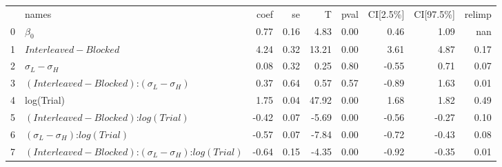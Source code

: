 \begin{tabular}{llrrrrrrr}
 & names & coef & se & T & pval & CI[2.5\%] & CI[97.5\%] & relimp \\
0 & $\beta_0$ & 0.77 & 0.16 & 4.83 & 0.00 & 0.46 & 1.09 & nan \\
1 & $Interleaved - Blocked$ & 4.24 & 0.32 & 13.21 & 0.00 & 3.61 & 4.87 & 0.17 \\
2 & $\sigma_L - \sigma_H$ & 0.08 & 0.32 & 0.25 & 0.80 & -0.55 & 0.71 & 0.07 \\
3 & $(Interleaved - Blocked)$:$(\sigma_L - \sigma_H)$ & 0.37 & 0.64 & 0.57 & 0.57 & -0.89 & 1.63 & 0.01 \\
4 & log(Trial) & 1.75 & 0.04 & 47.92 & 0.00 & 1.68 & 1.82 & 0.49 \\
5 & $(Interleaved - Blocked)$:$log(Trial)$ & -0.42 & 0.07 & -5.69 & 0.00 & -0.56 & -0.27 & 0.10 \\
6 & $(\sigma_L - \sigma_H)$:$log(Trial)$ & -0.57 & 0.07 & -7.84 & 0.00 & -0.72 & -0.43 & 0.08 \\
7 & $(Interleaved - Blocked)$:$(\sigma_L - \sigma_H)$:$log(Trial)$ & -0.64 & 0.15 & -4.35 & 0.00 & -0.92 & -0.35 & 0.01 \\
\end{tabular}
